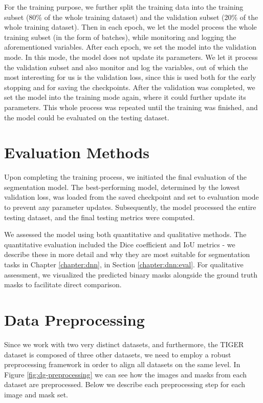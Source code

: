 For the training purpose, we further split the training data into the training subset (80\% of the whole training dataset) and the validation subset (20\% of the whole training dataset). Then in each epoch, we let the model process the whole training subset (in the form of batches), while monitoring and logging the aforementioned variables. After each epoch, we set the model into the validation mode. In this mode, the model does not update its parameters. We let it process the validation subset and also monitor and log the variables, out of which the most interesting for us is the validation loss, since this is used both for the early stopping and for saving the checkpoints. After the validation was completed, we set the model into the training mode again, where it could further update its parameters. This whole process was repeated until the training was finished, and the model could be evaluated on the testing dataset.

\section{Evaluation Methods}
Upon completing the training process, we initiated the final evaluation of the segmentation model. The best-performing model, determined by the lowest validation loss, was loaded from the saved checkpoint and set to evaluation mode to prevent any parameter updates. Subsequently, the model processed the entire testing dataset, and the final testing metrics were computed.

We assessed the model using both quantitative and qualitative methods. The quantitative evaluation included the Dice coefficient and IoU metrics - we describe these in more detail and why they are most suitable for segmentation tasks in Chapter \ref{chapter:dnn}, in Section \ref{chapter:dnn:eval}. For qualitative assessment, we visualized the predicted binary masks alongside the ground truth masks to facilitate direct comparison.

\section{Data Preprocessing}
Since we work with two very distinct datasets, and furthermore, the TIGER dataset is composed of three other datasets, we need to employ a robust preprocessing framework in order to align all datasets on the same level. In Figure \ref{fig:dg-preprocessing} we can see how the images and masks from each dataset are preprocessed. Below we describe each preprocessing step for each image and mask set.

